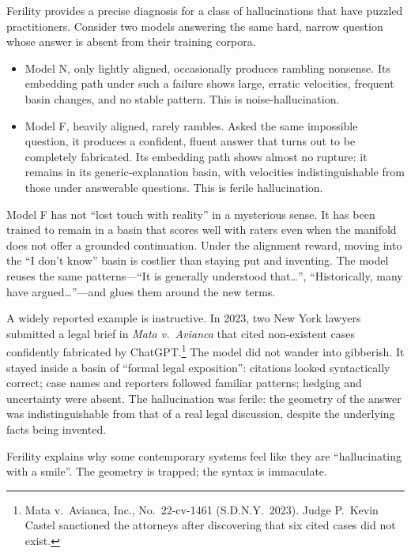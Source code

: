 Ferility provides a precise diagnosis for a class of hallucinations that have puzzled practitioners. Consider two models answering the same hard, narrow question whose answer is absent from their training corpora.

\begin{itemize}
  \item Model N, only lightly aligned, occasionally produces rambling nonsense. Its embedding path under such a failure shows large, erratic velocities, frequent basin changes, and no stable pattern. This is noise-hallucination.

  \item Model F, heavily aligned, rarely rambles. Asked the same impossible question, it produces a confident, fluent answer that turns out to be completely fabricated. Its embedding path shows almost no rupture: it remains in its generic-explanation basin, with velocities indistinguishable from those under answerable questions. This is ferile hallucination.
\end{itemize}

Model F has not ``lost touch with reality'' in a mysterious sense. It has been trained to remain in a basin that scores well with raters even when the manifold does not offer a grounded continuation. Under the alignment reward, moving into the ``I don't know'' basin is costlier than staying put and inventing. The model reuses the same patterns---``It is generally understood that\ldots'', ``Historically, many have argued\ldots''---and glues them around the new terms.

A widely reported example is instructive. In 2023, two New York lawyers submitted a legal brief in \emph{Mata v.\ Avianca} that cited non-existent cases confidently fabricated by ChatGPT.\footnote{Mata v.\ Avianca, Inc., No.\ 22-cv-1461 (S.D.N.Y.\ 2023). Judge P.\ Kevin Castel sanctioned the attorneys after discovering that six cited cases did not exist.} The model did not wander into gibberish. It stayed inside a basin of ``formal legal exposition'': citations looked syntactically correct; case names and reporters followed familiar patterns; hedging and uncertainty were absent. The hallucination was ferile: the geometry of the answer was indistinguishable from that of a real legal discussion, despite the underlying facts being invented.

Ferility explains why some contemporary systems feel like they are ``hallucinating with a smile''. The geometry is trapped; the syntax is immaculate.

